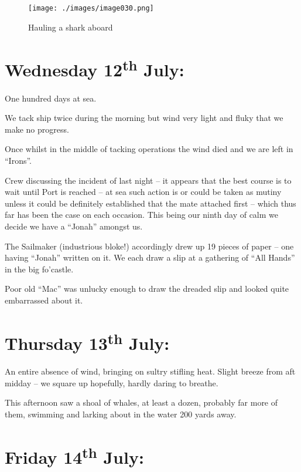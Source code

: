 \documentclass[
  11pt,
  msmallroyalvopaper
]{memoir}
\begin{document}
\begin{figure}
\centering
\texttt{[image: ./images/image030.png]}
\caption{Hauling a shark aboard}
\end{figure}

\hypertarget{wednesday-12th-july}{%
\section{\texorpdfstring{Wednesday 12\textsuperscript{th}
July:}{Wednesday 12th July:}}\label{wednesday-12th-july}}

One hundred days at sea.

We tack ship twice during the morning but wind very light and fluky that
we make no progress.

Once whilst in the middle of tacking operations the wind died and we are
left in ``Irons''.

Crew discussing the incident of last night -- it appears that the best
course is to wait until Port is reached -- at sea such action is or
could be taken as mutiny unless it could be definitely established that
the mate attached first -- which thus far has been the case on each
occasion. This being our ninth day of calm we decide we have a ``Jonah''
amongst us.

The Sailmaker (industrious bloke!) accordingly drew up 19 pieces of
paper -- one having ``Jonah'' written on it. We each draw a slip at a
gathering of ``All Hands'' in the big fo'castle.

Poor old ``Mac'' was unlucky enough to draw the dreaded slip and looked
quite embarrassed about it.

\hypertarget{thursday-13th-july}{%
\section{\texorpdfstring{Thursday 13\textsuperscript{th}
July:}{Thursday 13th July:}}\label{thursday-13th-july}}

An entire absence of wind, bringing on sultry stifling heat. Slight
breeze from aft midday -- we square up hopefully, hardly daring to
breathe.

This afternoon saw a shoal of whales, at least a dozen, probably far
more of them, swimming and larking about in the water 200 yards away.

\hypertarget{friday-14th-july}{%
\section{\texorpdfstring{Friday 14\textsuperscript{th}
July:}{Friday 14th July:}}\label{friday-14th-july}}
\end{document}
